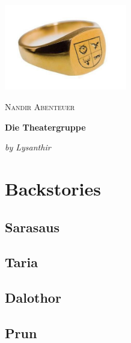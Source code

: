 \documentclass[10pt,twoside,twocolumn,openany]{book}
\begin{document}
	\begin{titlepage} %
		
		\centering
		\includegraphics[width=0.40\textwidth]{NandirLogo}\par\vspace{1cm}
		{\scshape\LARGE Nandir Abenteuer \par}
		\vspace{1cm}
		{\huge\bfseries Die Theatergruppe \par}
		\vspace{2cm}
		{\Large\itshape by Lysanthir \par}
		
		\vfill
		
		
	\end{titlepage}
	
	\tableofcontents %
	\newpage %
	
	\chapter{Backstories}
	
	\section{Sarasaus}
	
	\newpage
	\section{Taria}
	
	\newpage
	\section{Dalothor}
	
	\newpage
	\section{Prun}
	
\end{document}
